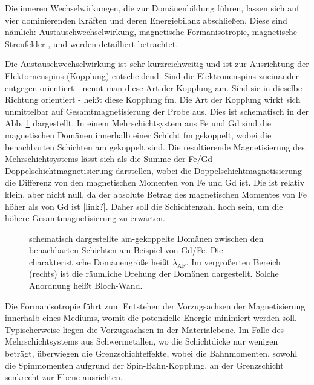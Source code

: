 \noindent
Die inneren Wechselwirkungen, die zur Domänenbildung führen, lassen sich auf vier dominierenden Kräften und deren Energiebilanz abschließen. Diese sind nämlich: Austauschwechselwirkung, magnetische Formanisotropie, magnetische Streufelder \cite[Kap. 3.2]{hubert_magnetic_1998}, \cite{hellwig_domain_2007} und werden detailliert betrachtet.

\noindent
Die Austauschwechselwirkung ist sehr kurzreichweitig und ist zur Ausrichtung der Elektornenspins (Kopplung) entscheidend. Sind die Elektronenspins zueinander entgegen orientiert - nennt man diese Art der Kopplung \gls{am}. Sind sie in dieselbe Richtung orientiert - heißt diese Kopplung \gls{fm}. Die Art der Kopplung wirkt sich unmittelbar auf Gesamtmagnetisierung der Probe aus. Dies ist schematisch in der Abb. \ref{fig:am_fm_kopplung} dargestellt. In einem Mehrschichtsystem aus Fe und Gd sind die magnetischen Domänen innerhalb einer Schicht \gls{fm} gekoppelt, wobei die benachbarten Schichten \gls{am} gekoppelt sind. Die resultierende Magnetisierung des Mehrschichtsystems lässt sich als die Summe der Fe/Gd-Doppelschichtmagnetisierung darstellen, wobei die Doppelschichtmagnetisierung die Differenz von den magnetischen Momenten von Fe und Gd ist. Die ist relativ klein, aber nicht null, da der absolute Betrag des magnetischen Momentes von Fe höher als von Gd ist [link?]. Daher soll die Schichtenzahl hoch sein, um die höhere Gesamtmagnetisierung zu erwarten.
\begin{figure}[H]
    \centering
    
    \caption{schematisch dargestellte \gls{am}-gekoppelte Domänen zwischen den benachbarten Schichten am Beispiel von Gd/Fe. Die charakteristische Domänengröße heißt $\lambda_{\text{AF}}$. Im vergrößerten Bereich (rechts) ist die räumliche Drehung der Domänen dargestellt. Solche Anordnung heißt Bloch-Wand.}
    \label{fig:am_fm_kopplung}
\end{figure}
\noindent
Die Formanisotropie führt zum Entstehen der Vorzugsachsen der Magnetisierung innerhalb eines Mediums, womit die potenzielle Energie minimiert werden soll. Typischerweise liegen die Vorzugsachsen in der Materialebene. Im Falle des Mehrschichtsystems aus Schwermetallen, wo die Schichtdicke nur wenigen  beträgt, überwiegen die Grenzschichteffekte, wobei die Bahnmomenten, sowohl die Spinmomenten aufgrund der Spin-Bahn-Kopplung, an der Grenzschicht senkrecht zur Ebene ausrichten.

